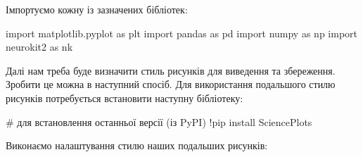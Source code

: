 \documentclass[
  letterpaper,
]{report}
\newenvironment{Shaded}{\begin{snugshade}}{\end{snugshade}}
\newcommand{\CommentTok}[1]{\textcolor[rgb]{0.37,0.37,0.37}{#1}}
\newcommand{\ImportTok}[1]{\textcolor[rgb]{0.00,0.46,0.62}{#1}}
\newcommand{\NormalTok}[1]{\textcolor[rgb]{0.00,0.23,0.31}{#1}}
\newcommand{\OperatorTok}[1]{\textcolor[rgb]{0.37,0.37,0.37}{#1}}
\begin{document}
Імпортуємо кожну із зазначених бібліотек:

\begin{Shaded}
\begin{Highlighting}[]
\ImportTok{import}\NormalTok{ matplotlib.pyplot }\ImportTok{as}\NormalTok{ plt}
\ImportTok{import}\NormalTok{ pandas }\ImportTok{as}\NormalTok{ pd }
\ImportTok{import}\NormalTok{ numpy }\ImportTok{as}\NormalTok{ np}
\ImportTok{import}\NormalTok{ neurokit2 }\ImportTok{as}\NormalTok{ nk}
\end{Highlighting}
\end{Shaded}

Далі нам треба буде визначити стиль рисунків для виведення та
збереження. Зробити це можна в наступний спосіб. Для використання
подальшого стилю рисунків потребується встановити наступну бібліотеку:

\begin{Shaded}
\begin{Highlighting}[]
\CommentTok{\# для встановлення останньої версії (із PyPI)}
\OperatorTok{!}\NormalTok{pip install SciencePlots}
\end{Highlighting}
\end{Shaded}

Виконаємо налаштування стилю наших подальших рисунків:
\end{document}
